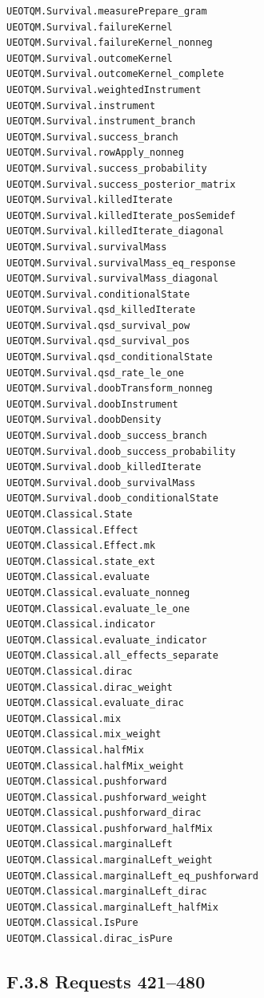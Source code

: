 \documentclass[
  11pt,
  oneside]{book}
\begin{document}
\begin{Verbatim}[breaklines,breakanywhere,fontsize=\scriptsize]
UEOTQM.Survival.measurePrepare_gram
UEOTQM.Survival.failureKernel
UEOTQM.Survival.failureKernel_nonneg
UEOTQM.Survival.outcomeKernel
UEOTQM.Survival.outcomeKernel_complete
UEOTQM.Survival.weightedInstrument
UEOTQM.Survival.instrument
UEOTQM.Survival.instrument_branch
UEOTQM.Survival.success_branch
UEOTQM.Survival.rowApply_nonneg
UEOTQM.Survival.success_probability
UEOTQM.Survival.success_posterior_matrix
UEOTQM.Survival.killedIterate
UEOTQM.Survival.killedIterate_posSemidef
UEOTQM.Survival.killedIterate_diagonal
UEOTQM.Survival.survivalMass
UEOTQM.Survival.survivalMass_eq_response
UEOTQM.Survival.survivalMass_diagonal
UEOTQM.Survival.conditionalState
UEOTQM.Survival.qsd_killedIterate
UEOTQM.Survival.qsd_survival_pow
UEOTQM.Survival.qsd_survival_pos
UEOTQM.Survival.qsd_conditionalState
UEOTQM.Survival.qsd_rate_le_one
UEOTQM.Survival.doobTransform_nonneg
UEOTQM.Survival.doobInstrument
UEOTQM.Survival.doobDensity
UEOTQM.Survival.doob_success_branch
UEOTQM.Survival.doob_success_probability
UEOTQM.Survival.doob_killedIterate
UEOTQM.Survival.doob_survivalMass
UEOTQM.Survival.doob_conditionalState
UEOTQM.Classical.State
UEOTQM.Classical.Effect
UEOTQM.Classical.Effect.mk
UEOTQM.Classical.state_ext
UEOTQM.Classical.evaluate
UEOTQM.Classical.evaluate_nonneg
UEOTQM.Classical.evaluate_le_one
UEOTQM.Classical.indicator
UEOTQM.Classical.evaluate_indicator
UEOTQM.Classical.all_effects_separate
UEOTQM.Classical.dirac
UEOTQM.Classical.dirac_weight
UEOTQM.Classical.evaluate_dirac
UEOTQM.Classical.mix
UEOTQM.Classical.mix_weight
UEOTQM.Classical.halfMix
UEOTQM.Classical.halfMix_weight
UEOTQM.Classical.pushforward
UEOTQM.Classical.pushforward_weight
UEOTQM.Classical.pushforward_dirac
UEOTQM.Classical.pushforward_halfMix
UEOTQM.Classical.marginalLeft
UEOTQM.Classical.marginalLeft_weight
UEOTQM.Classical.marginalLeft_eq_pushforward
UEOTQM.Classical.marginalLeft_dirac
UEOTQM.Classical.marginalLeft_halfMix
UEOTQM.Classical.IsPure
UEOTQM.Classical.dirac_isPure
\end{Verbatim}

\subsection{F.3.8 Requests 421--480}
\end{document}
